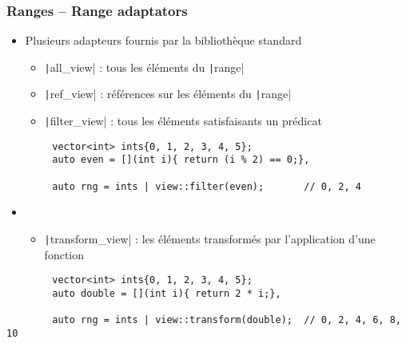 \documentclass[C++.tex]{subfiles}
\begin{document}
\begin{frame}[fragile]
	\frametitle{Ranges -- Range adaptators}
	\begin{itemize}
		\item Plusieurs adapteurs fournis par la bibliothèque standard


		\begin{itemize}
			\item \texttt|all_view| : tous les éléments du \texttt|range|
			\item \texttt|ref_view| : références sur les éléments du \texttt|range|
			\item \texttt|filter_view| : tous les éléments satisfaisants un prédicat
		\end{itemize}
	\end{itemize}

	\begin{verbatim}
		vector<int> ints{0, 1, 2, 3, 4, 5};
		auto even = [](int i){ return (i % 2) == 0;},

		auto rng = ints | view::filter(even);       // 0, 2, 4
	\end{verbatim}
 
	\begin{itemize}
		\item [] \begin{itemize}
			\item \texttt|transform_view| : les éléments transformés par l'application d'une fonction 
		\end{itemize}
	\end{itemize}

	\begin{verbatim}
		vector<int> ints{0, 1, 2, 3, 4, 5};
		auto double = [](int i){ return 2 * i;},

		auto rng = ints | view::transform(double);  // 0, 2, 4, 6, 8, 10
	\end{verbatim}
\end{frame}
\end{document}

